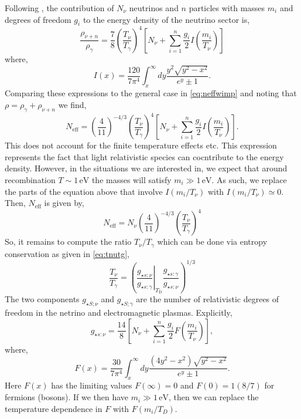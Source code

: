 \documentclass[11pt]{article}
\numberwithin{equation}{section}
\numberwithin{figure}{section}
\numberwithin{table}{section}
\begin{document}
Following \citet{Boehm:2013jpa}, the contribution of $N_\nu$ neutrinos and $n$ particles with masses $m_i$ and degrees of freedom $g_i$ to the energy density of the neutrino sector is,
\begin{equation}
\frac{\rho_{\nu+n}}{\rho_{\gamma}}=\frac{7}{8}\left(\frac{T_{\nu}}{T_{\gamma}}\right)^{4}\left[N_{\nu}+\sum_{i=1}^{n} \frac{g_{i}}{2} I\left(\frac{m_{i}}{T_{\nu}}\right)\right]
\end{equation}
where,
\begin{equation}
I(x)=\frac{120}{7 \pi^{4}} \int_{x}^{\infty} d y \frac{y^{2} \sqrt{y^{2}-x^{2}}}{e^{y} \pm 1}.
\end{equation}
Comparing these expressions to the general case in \eqref{eq:neffwimp} and noting that $\rho = \rho_\gamma + \rho_{\nu + n}$ we find,
\begin{equation}
N_{\mathrm{eff}}=\left(\frac{4}{11}\right)^{-4 / 3}\left(\frac{T_{\nu}}{T_{\gamma}}\right)^{4}\left[N_{\nu}+\sum_{i=1}^{n} \frac{g_{i}}{2} I\left(\frac{m_{i}}{T_{\nu}}\right)\right].
\end{equation}
This does not account for the finite temperature effects etc. This expression represents the fact that light relativistic species can cocntribute to the energy density. However, in the situations we are interested in, we expect that around recombination $T \sim 1 \, \mathrm{eV}$ the masses will satisfy $m_i \gg 1 \, \mathrm{eV}$. As such, we replace the parts of the equation above that involve $I(m_i/T_\nu)$ with $I(m_i/T_\nu) \simeq 0$. Then, $N_{\mathrm{eff}}$ is given by,
\begin{equation}
N_{\mathrm{eff}}=N_{\nu}\left(\frac{4}{11}\right)^{-4 / 3}\left(\frac{T_{\nu}}{T_{\gamma}}\right)^{4}
\end{equation}
So, it remains to compute the ratio $T_\nu/T_\gamma$ which can be done via entropy conservation as given in \eqref{eq:tnutg},
\begin{equation}
\frac{T_{\nu}}{T_{\gamma}}=\left(\left.\frac{g_{\star s : \nu}}{g_{\star s : \gamma}}\right|_{T_{\mathrm{D}}} \frac{g_{\star s : \gamma}}{g_{\star s : \nu}}\right)^{1 / 3}
\end{equation}
The two components $g_{\star S; \nu}$ and $g_{\star S; \gamma}$ are the number of relativistic degrees of freedom in the netrino and electromagnetic plasmas. Explicitly,
\begin{equation}
g_{\star s : \nu}=\frac{14}{8}\left[N_{\nu}+\sum_{i=1}^{n} \frac{g_{i}}{2} F\left(\frac{m_{i}}{T_{\nu}}\right)\right],
\end{equation}
where,
\begin{equation}
F(x)=\frac{30}{7 \pi^{4}} \int_{x}^{\infty} d y \frac{\left(4 y^{2}-x^{2}\right) \sqrt{y^{2}-x^{2}}}{e^{y} \pm 1}.
\end{equation}
Here $F(x)$ has the limiting values $F(\infty) = 0$ and $F(0) = 1 (8/7)$ for fermions (bosons). If we then have $m_i \gg 1 \, \mathrm{eV}$, then we can replace the temperature dependence in $F$ with $F(m_i/T_D)$.
\end{document}
